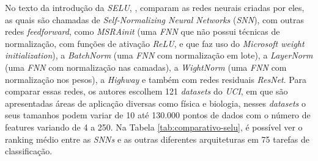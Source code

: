 No texto da introdução da \textit{SELU}, \textcite{SELUArticle}, comparam as redes neurais criadas por eles, as quais são chamadas de \textit{Self-Normalizing Neural Networks} (\textit{SNN}), com outras redes \textit{feedforward}, como \textit{MSRAinit} (uma \textit{FNN} que não possui técnicas de normalização, com funções de ativação \textit{ReLU}, e que faz uso do \textit{Microsoft weight initialization}), a \textit{BatchNorm} (uma \textit{FNN} com normalização em lote), a \textit{LayerNorm} (uma \textit{FNN} com normalização nas camadas), a \textit{WightNorm} (uma \textit{FNN} com normalização nos pesos), a \textit{Highway} e também com redes residuais \textit{ResNet}. Para comparar essas redes, os autores escolhem 121 \textit{datasets} do \textit{UCI}, em que são apresentadas áreas de aplicação diversas como física e biologia, nesses \textit{datasets} o seus tamanhos podem variar de 10 até 130.000 pontos de dados com o número de features variando de 4 a 250. Na Tabela \ref{tab:comparativo-selu}, é possível ver o ranking médio entre as \textit{SNNs} e as outras diferentes arquiteturas em 75 tarefas de classificação.

